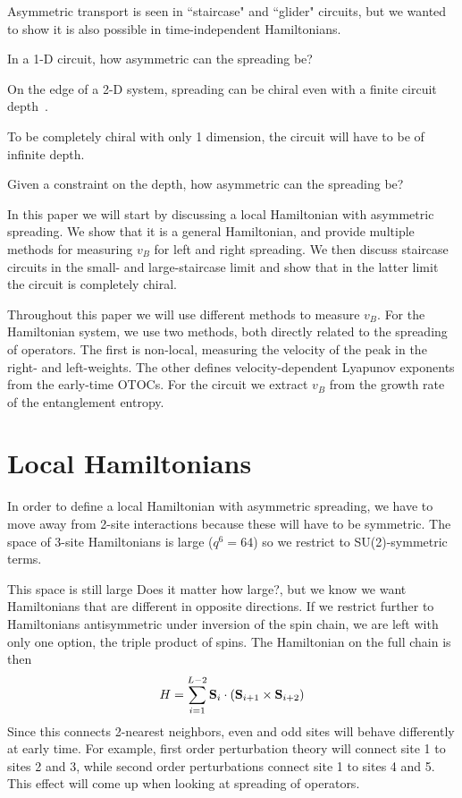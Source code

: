 \documentclass[aps,prx,reprint,superscriptaddress, longbibliography]{revtex4-1}
\newcommand{\charlie}[1]{ {\color{Magenta} {{#1}}}}
\begin{document}
Asymmetric transport is seen in ``staircase" and ``glider" circuits, but we wanted to show it is also possible in time-independent Hamiltonians. 

In a 1-D circuit, how asymmetric can the spreading be?

On the edge of a 2-D system, spreading can be chiral even with a finite circuit depth~\cite{PoChiralCircuit}.

To be completely chiral with only 1 dimension, the circuit will have to be of infinite depth.

Given a constraint on the depth, how asymmetric can the spreading be?

In this paper we will start by discussing a local Hamiltonian with asymmetric spreading. We show that it is a general Hamiltonian, and provide multiple methods for measuring $v_B$ for left and right spreading. We then discuss staircase circuits in the small- and large-staircase limit and show that in the latter limit the circuit is completely chiral.

Throughout this paper we will use different methods to measure $v_B$. For the Hamiltonian system, we use two methods, both directly related to the spreading of operators. The first is non-local, measuring the velocity of the peak in the right- and left-weights. The other defines velocity-dependent Lyapunov exponents from the early-time OTOCs. For the circuit we extract $v_B$ from the growth rate of the entanglement entropy.

\tableofcontents

\section{Local Hamiltonians}

In order to define a local Hamiltonian with asymmetric spreading, we have to move away from 2-site interactions because these will have to be symmetric. The space of 3-site Hamiltonians is large ($q^{6} = 64$) so we restrict to SU(2)-symmetric terms.

This space is still large \charlie{Does it matter how large?}, but we know we want Hamiltonians that are different in opposite directions. If we restrict further to Hamiltonians antisymmetric under inversion of the spin chain, we are left with only one option, the triple product of spins. The Hamiltonian on the full chain is then
\begin{align}
H = \sum_{i=1}^{L-2}{\bf S}_i\cdot({\bf S}_{i+1}\times {\bf S}_{i+2})\nonumber
\end{align}
Since this connects 2-nearest neighbors, even and odd sites will behave differently at early time. For example, first order perturbation theory will connect site 1 to sites 2 and 3, while second order perturbations connect site 1 to sites 4 and 5. This effect will come up when looking at spreading of operators.
\end{document}
